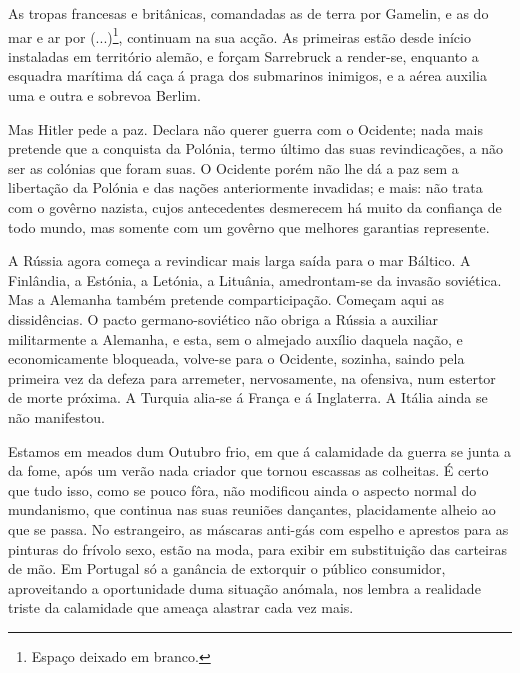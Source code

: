 \documentclass[9pt]{article}
\begin{document}
As tropas francesas e britânicas, comandadas as de terra por Gamelin,
e as do mar e ar por%
(...)\footnote{Espaço deixado em branco.},
continuam na sua ac\-ção. As primeiras estão
desde início instaladas em território alemão, e forçam Sarrebruck a render-se, enquanto a esquadra marítima dá caça á praga dos submarinos inimigos,
e a aérea auxilia uma e outra e sobrevoa Berlim.

Mas Hitler pede a paz. Declara não querer guerra com o Ocidente; nada
mais pretende que a conquista da Polónia, termo último das suas revindica\-ções, a não ser as colónias que foram suas. O Ocidente porém não lhe dá a
paz sem a liberta\-ção da Polónia e das na\-ções anteriormente invadidas; e
mais: não trata com o govêrno nazista, cujos antecedentes desmerecem há
muito da confian\-ça de todo mundo, mas somente com um govêrno que me\-lhores
garantias represente.

A Rússia agora começa a revindicar mais larga saída para o mar Báltico.
A Finlândia, a Estónia, a Letónia, a Lituânia, amedrontam-se da invasão soviética. Mas a Alemanha também pretende comparticipa\-ção. Começam aqui as dissidên\-cias. O pacto germano-soviético não obriga a Rússia a auxiliar militarmente a Alemanha, e esta, sem o almejado auxílio daquela na\-ção, e economicamente bloqueada, volve-se para o Ocidente, sozinha, saindo pela primeira vez
da defeza para arremeter, nervosamente, na ofensiva, num estertor de morte
próxima. A Turquia alia-se á Fran\-ça e á Inglaterra. A Itália ainda se não
manifestou.

Estamos em meados dum Outubro frio, em que á calamidade da guerra se
junta a da fome, após um verão nada criador que tornou escassas as co\-lheitas.
É certo que tudo isso, como se pouco fôra, não modificou ainda o aspecto normal do mundanismo, que continua nas suas reuniões dan\-çantes, placidamente
a\-lheio ao que se passa. No estrangeiro, as máscaras anti-gás com espe\-lho e
aprestos para as pinturas do frívolo sexo, estão na moda, para exibir em substitui\-ção das carteiras de mão. Em Portugal só a ganância de extorquir o público consumidor, aproveitando a oportunidade duma situa\-ção anómala, nos lembra a realidade triste da calamidade que ameaça alastrar cada vez mais.
\end{document}
